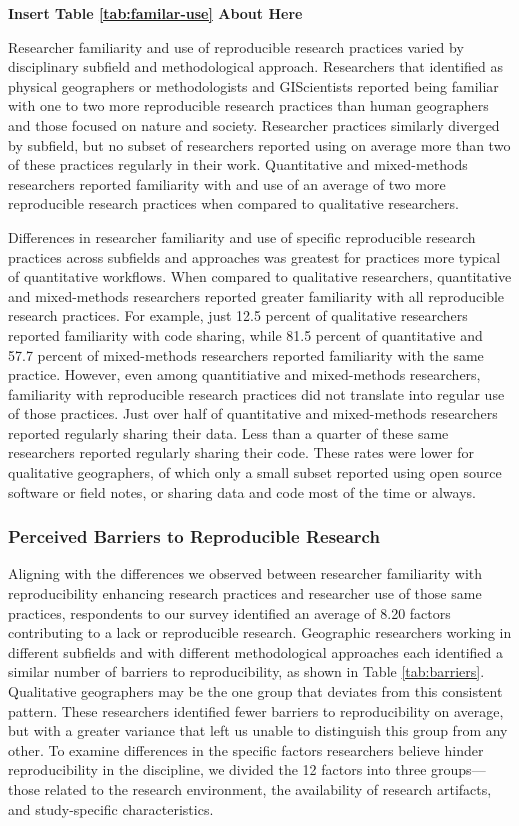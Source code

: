\documentclass[]{interact}
\theoremstyle{plain}%
\theoremstyle{definition}
\theoremstyle{remark}
\begin{document}
\begin{center}
\textbf{Insert Table \ref{tab:familar-use} About Here}
\end{center}

Researcher familiarity and use of reproducible research practices varied by disciplinary subfield and methodological approach. 
Researchers that identified as physical geographers or methodologists and GIScientists reported being familiar with one to two more reproducible research practices than human geographers and those focused on nature and society.
Researcher practices similarly diverged by subfield, but no subset of researchers reported using on average more than two of these practices regularly in their work.  
Quantitative and mixed-methods researchers reported familiarity with and use of an average of two more reproducible research practices when compared to qualitative researchers.

Differences in researcher familiarity and use of specific reproducible research practices across subfields and approaches was greatest for practices more typical of quantitative workflows. 
When compared to qualitative researchers, quantitative and mixed-methods researchers reported greater familiarity with all reproducible research practices.
For example, just 12.5 percent of qualitative researchers reported familiarity with code sharing, while 81.5 percent of quantitative and 57.7 percent of mixed-methods researchers reported familiarity with the same practice.
However, even among quantitiative and mixed-methods researchers, familiarity with reproducible research practices did not translate into regular use of those practices.
Just over half of quantitative and mixed-methods researchers reported regularly sharing their data.
Less than a quarter of these same researchers reported regularly sharing their code. 
These rates were lower for qualitative geographers, of which only a small subset reported using open source software or field notes, or sharing data and code most of the time or always.

\subsubsection*{Perceived Barriers to Reproducible Research}
Aligning with the differences we observed between researcher familiarity with reproducibility enhancing research practices and researcher use of those same practices, respondents to our survey identified an average of 8.20 factors contributing to a lack or reproducible research. 
Geographic researchers working in different subfields and with different methodological approaches each identified a similar number of barriers to reproducibility, as shown in Table \ref{tab:barriers}.
Qualitative geographers may be the one group that deviates from this consistent pattern. 
These researchers identified fewer barriers to reproducibility on average, but with a greater variance that left us unable to distinguish this group from any other.
To examine differences in the specific factors researchers believe hinder reproducibility in the discipline, we divided the 12 factors into three groups---those related to the research environment, the availability of research artifacts, and study-specific characteristics. 
\end{document}
